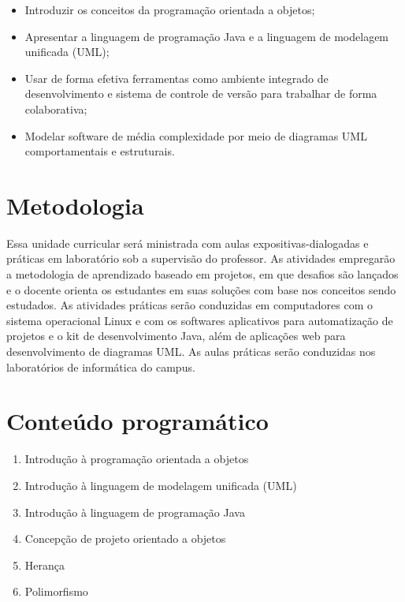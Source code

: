 \documentclass[11pt]{../classes/ifscarticle}
\begin{document}
\begin{itemize}
    \item Introduzir os conceitos da programação orientada a objetos;
    \item Apresentar a linguagem de programação Java e a linguagem de modelagem unificada (UML);
    \item Usar de forma efetiva ferramentas como ambiente integrado de desenvolvimento e sistema de controle de versão para trabalhar de forma colaborativa;
    \item Modelar software de média complexidade por meio de diagramas UML comportamentais e estruturais.
\end{itemize}



\section{Metodologia}

Essa unidade curricular será ministrada com aulas expositivas-dialogadas e práticas em laboratório sob a supervisão do professor. As atividades empregarão a metodologia de aprendizado baseado em projetos, em que desafios são lançados e o docente orienta os estudantes em suas soluções com base nos conceitos sendo estudados. As atividades práticas serão conduzidas em computadores com o sistema operacional Linux e com os softwares aplicativos para automatização de projetos e o kit de desenvolvimento Java, além de aplicações web para desenvolvimento de diagramas UML. As aulas práticas serão conduzidas nos laboratórios de informática do campus.

\section{Conteúdo programático}

\begin{enumerate}
	\item Introdução à programação orientada a objetos
	\item Introdução à linguagem de modelagem unificada (UML)
	\item Introdução à linguagem de programação Java
	\item Concepção de projeto orientado a objetos
	\item Herança
	\item Polimorfismo
\end{enumerate}


\nocite{*}

\printbibliography[heading=bibintoc,keyword={basica},title={Bibliografia básica}]%

\printbibliography[heading=bibintoc,keyword={complementar},title={Bibliografia complementar}]%
\end{document}
